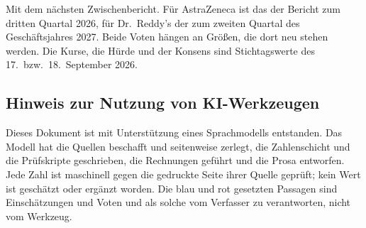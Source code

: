 Mit dem n\"achsten Zwischenbericht. F\"ur AstraZeneca ist das der Bericht
zum dritten Quartal 2026, f\"ur Dr.~Reddy's der zum zweiten Quartal des
Gesch\"aftsjahres 2027. Beide Voten h\"angen an Gr\"o{\ss}en, die dort neu
stehen werden. Die Kurse, die H\"urde und der Konsens sind Stichtagswerte des
17.~bzw.\ 18.~September 2026.

\subsection*{Hinweis zur Nutzung von KI-Werkzeugen}

Dieses Dokument ist mit Unterst\"utzung eines Sprachmodells entstanden. Das
Modell hat die Quellen beschafft und seitenweise zerlegt, die Zahlenschicht
und die Pr\"ufskripte geschrieben, die Rechnungen gef\"uhrt und die Prosa
entworfen. Jede Zahl ist maschinell gegen die gedruckte Seite ihrer Quelle
gepr\"uft; kein Wert ist gesch\"atzt oder erg\"anzt worden. Die blau und rot
gesetzten Passagen sind Einsch\"atzungen und Voten und als solche vom
Verfasser zu verantworten, nicht vom Werkzeug.
